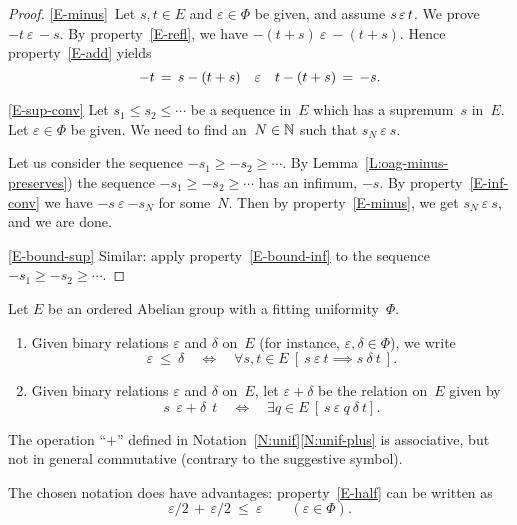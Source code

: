 \documentclass[main.tex]{subfiles}
\begin{document}
\begin{proof}
\noindent\ref{E-minus}\ 
Let $s,t\in E$ and $\varepsilon\in \Phi$ be given,
and assume $s\,\varepsilon\, t$.
We prove $-t\ \varepsilon\,-\!\!s$.
By property~\ref{E-refl},
we have $-(t+s) \ \varepsilon\ -(t+s)$.
Hence property~\ref{E-add} yields
\begin{equation*}
-t\,=\,s-(t+s)\quad\varepsilon\quad t-(t+s) \,=\,-s.
\end{equation*}

\noindent\ref{E-sup-conv}
Let $s_1 \leq s_2 \leq \dotsb$
be a sequence in~$E$
which has a supremum~$s$ in~$E$.
Let $\varepsilon \in \Phi$ be given.
We need to find an~$N\in\mathbb{N}$
such that $s_N \ \varepsilon\ s$.

Let us consider the sequence
$-s_1 \geq -s_2 \geq\dotsb$.
By Lemma~\ref{L:oag-minus-preserves})
the sequence $-s_1 \geq -s_2 \geq \dotsb$
has an infimum, $-s$.
By property~\ref{E-inf-conv}
we have 
$-s\ \varepsilon\ {-s_N}$
for some~$N$.
Then by property~\ref{E-minus},
we get $s_N\ \varepsilon\ s$,
and we are done.

\vspace{.3em}
\noindent\ref{E-bound-sup}
Similar:
apply property~\ref{E-bound-inf}
to the sequence $-s_1 \geq -s_2 \geq \dotsb$.
\end{proof}

%
%
\begin{nt}
\label{N:unif}
Let $E$ be an ordered Abelian group
with a fitting uniformity~$\Phi$.
\begin{enumerate}
\item
\label{N:unif-leq}
Given binary relations $\varepsilon$
and $\delta$ on~$E$
(for instance, $\varepsilon,\delta\in \Phi$),
we write
\begin{equation*}
\varepsilon \ \leq\ \delta
\quad\iff\quad 
\forall s,t\in E\ 
[\ s\ \varepsilon\ t
\implies
s\ \delta\ t\ ].
\end{equation*}

\item
\label{N:unif-plus}
Given binary relations $\varepsilon$ and $\delta$ on~$E$,
let $\varepsilon + \delta$
be the relation on~$E$ given by
\begin{equation*}
s\ \ \varepsilon + \delta\ \ t
\quad\iff\quad
\exists q\in E\ 
[\ s\ \varepsilon\ q\ \delta\ t].
\end{equation*}
\end{enumerate}
\end{nt}
\begin{rem}
The operation ``$+$''
defined in Notation~\ref{N:unif}\ref{N:unif-plus}
is associative,
but not in general commutative
(contrary to the suggestive symbol).

The chosen notation does have advantages:
property~\ref{E-half} can be written as
\begin{equation*}
\varepsilon/2 \,+\,\varepsilon/2 \ \leq\ \varepsilon
\qquad(\varepsilon \in \Phi).
\end{equation*}
\end{rem}
\end{document}
